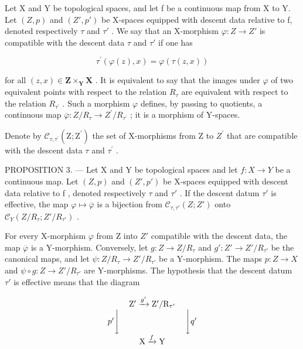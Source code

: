Let X and Y be topological spaces, and let f be a continuous map from X to Y. Let \((Z,p)\) and \((Z',p')\) be X-spaces equipped with descent data relative to f, denoted respectively \(\tau\) and \(\tau'\) . We say that an X-morphism \(\varphi\colon Z\to Z'\) is compatible with the descent data \(\tau\) and \(\tau'\) if one has

\[
\tau^ {\prime} (\varphi (z), x) = \varphi (\tau (z, x))
\]

for all \((z,x)\in\mathbf{Z}\times_{\mathbf{Y}}\mathbf{X}\) . It is equivalent to say that the images under \(\varphi\) of two equivalent points with respect to the relation \(R_{\tau}\) are equivalent with respect to the relation \(R_{\tau^{\prime}}\) . Such a morphism \(\varphi\) defines, by passing to quotients, a continuous map \(\overline{\varphi}:Z/R_{\tau}\to Z^{\prime}/R_{\tau^{\prime}}\) ; it is a morphism of Y-spaces.

Denote by \(\mathcal{C}_{\tau,\tau^{\prime}}(\mathrm{Z};\mathrm{Z}^{\prime})\) the set of X-morphisms from Z to \(Z^{\prime}\) that are compatible with the descent data \(\tau\) and \(\tau^{\prime}\) .

PROPOSITION 3. --- Let X and Y be topological spaces and let \(f\colon X \to Y\) be a continuous map. Let \((Z,p)\) and \((Z',p')\) be X-spaces equipped with descent data relative to f , denoted respectively \(\tau\) and \(\tau'\) . If the descent datum \(\tau'\) is effective, the map \(\varphi \mapsto \overline{\varphi}\) is a bijection from \(\mathcal{C}_{\tau,\tau'}(Z;Z')\) onto \(\mathcal{C}_Y(Z/R_\tau;Z'/R_{\tau'})\) .

For every X-morphism \(\varphi\) from Z into \(Z'\) compatible with the descent data, the map \(\overline{\varphi}\) is a Y-morphism. Conversely, let \(g\colon Z\to Z/R_{\tau}\) and \(g'\colon Z'\to Z'/R_{\tau'}\) be the canonical maps, and let \(\psi\colon Z/R_{\tau}\to Z'/R_{\tau'}\) be a Y-morphism. The maps \(p\colon Z\to X\) and \(\psi\circ g\colon Z\to Z'/R_{\tau'}\) are Y-morphisms. The hypothesis that the descent datum \(\tau'\) is effective means that the diagram

\[
\begin{array}{c} \mathrm {Z^ {\prime}} \xrightarrow {g ^ {\prime}} \mathrm {Z}^ {\prime} / \mathrm {R}_ {\tau^ {\prime}} \\ p ^ {\prime} \Biggl \downarrow \qquad \qquad \qquad \qquad \Biggl \downarrow q ^ {\prime} \\ \mathrm{X} \xrightarrow {f} \mathrm{Y} \end{array}
\]

